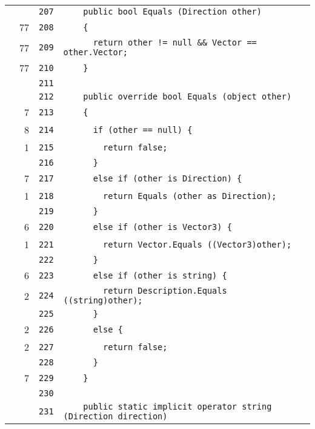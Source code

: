 \documentclass[a4paper,10pt]{article}
\begin{document}
\begin{longtable}[l]{lrrl}
\cellcolor{gray} &  & \verb~207~ & \verb~    public bool Equals (Direction other)~\\
\cellcolor{green} & 77 & \verb~208~ & \verb~    {~\\
\cellcolor{green} & 77 & \verb~209~ & \verb~      return other != null && Vector == other.Vector;~\\
\cellcolor{green} & 77 & \verb~210~ & \verb~    }~\\
\cellcolor{gray} &  & \verb~211~ & \verb~~\\
\cellcolor{gray} &  & \verb~212~ & \verb~    public override bool Equals (object other)~\\
\cellcolor{green} & 7 & \verb~213~ & \verb~    {~\\
\cellcolor{green} & 8 & \verb~214~ & \verb~      if (other == null) {~\\
\cellcolor{green} & 1 & \verb~215~ & \verb~        return false;~\\
\cellcolor{gray} &  & \verb~216~ & \verb~      }~\\
\cellcolor{green} & 7 & \verb~217~ & \verb~      else if (other is Direction) {~\\
\cellcolor{green} & 1 & \verb~218~ & \verb~        return Equals (other as Direction);~\\
\cellcolor{gray} &  & \verb~219~ & \verb~      }~\\
\cellcolor{green} & 6 & \verb~220~ & \verb~      else if (other is Vector3) {~\\
\cellcolor{green} & 1 & \verb~221~ & \verb~        return Vector.Equals ((Vector3)other);~\\
\cellcolor{gray} &  & \verb~222~ & \verb~      }~\\
\cellcolor{green} & 6 & \verb~223~ & \verb~      else if (other is string) {~\\
\cellcolor{green} & 2 & \verb~224~ & \verb~        return Description.Equals ((string)other);~\\
\cellcolor{gray} &  & \verb~225~ & \verb~      }~\\
\cellcolor{green} & 2 & \verb~226~ & \verb~      else {~\\
\cellcolor{green} & 2 & \verb~227~ & \verb~        return false;~\\
\cellcolor{gray} &  & \verb~228~ & \verb~      }~\\
\cellcolor{green} & 7 & \verb~229~ & \verb~    }~\\
\cellcolor{gray} &  & \verb~230~ & \verb~~\\
\cellcolor{gray} &  & \verb~231~ & \verb~    public static implicit operator string (Direction direction)~\\

\end{longtable}
\end{document}
